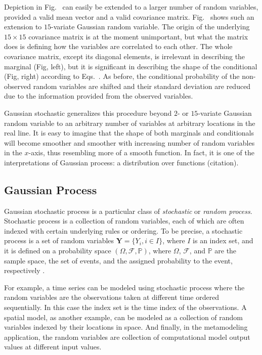 Depiction in Fig.~ can easily be extended to a larger number of random variables, provided a valid mean vector and a valid covariance matrix.
Fig.~ shows such an extension to $15$-variate Gaussian random variable.
The origin of the underlying $15 \times 15$ covariance matrix is at the moment unimportant, but what the matrix does is defining how the variables are correlated to each other.
The whole covariance matrix, except its diagonal elements, is irrelevant in describing the marginal (Fig, left),
but it is significant in describing the shape of the conditional (Fig, right) according to Eqs.~.
As before, the conditional probability of the non-observed random variables are shifted and their standard deviation are reduced due to the information provided from the observed variables.

Gaussian stochastic generalizes this procedure beyond $2$- or $15$-variate Gaussian random variable to an arbitrary number of variables at arbitrary locations in the real line.
It is easy to imagine that the shape of both marginals and conditionals will become smoother and smoother with increasing number of random variables in the $x$-axis, thus resembling more of a smooth function.
In fact, it is one of the interpretations of Gaussian process: a distribution over functions (citation). 


\subsection{Gaussian Process}

Gaussian stochastic process is a particular class of \emph{stochastic} or \emph{random process}.
Stochastic process is a collection of random variables, each of which are often indexed with certain underlying rules or ordering.
To be precise, a stochastic process is a set of random variables $\mathbf{Y} = \{Y_i, i \in I\}$, where $I$ is an index set, 
and it is defined on a probability space $(\Omega, \mathcal{F}, \mathbb{P})$, 
where $\Omega$, $\mathcal{F}$, and $\mathbb{P}$ are the sample space, the set of events, and the assigned probability to the event, respectively \cite{Syski2014}.

For example, a time series can be modeled using stochastic process where the random variables are the observations taken at different time ordered sequentially.
In this case the index set is the time index of the observations.
A spatial model, as another example, can be modeled as a collection of random variables indexed by their locations in space.
And finally, in the metamodeling application, the random variables are collection of computational model output values at different input values.

